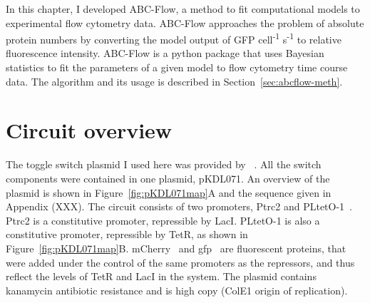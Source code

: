 In this chapter, I developed ABC-Flow, a method to fit computational models to experimental flow cytometry data. ABC-Flow approaches the problem of absolute protein numbers by converting the model output of GFP cell\textsuperscript{-1} s\textsuperscript{-1} to relative fluorescence intensity. ABC-Flow is a python package that uses Bayesian statistics to fit the parameters of a given model to flow cytometry time course data. The algorithm and its usage is described in Section~\ref{sec:abcflow-meth}.





\section{Circuit overview}

The toggle switch plasmid I used here was provided by ~\textcite{Litcofsky:2012gr}. All the switch components were contained in one plasmid, pKDL071. An overview of the plasmid is shown in Figure~\ref{fig:pKDL071map}A and the sequence given in Appendix (XXX). The circuit consists of two promoters, Ptrc2 and PLtetO-1~\autocite{Lutz:1997ti}. Ptrc2 is a constitutive promoter, repressible by LacI. PLtetO-1 is also a constitutive promoter, repressible by TetR, as shown in Figure~\ref{fig:pKDL071map}B. mCherry~\autocite{Shaner:2004vy} and \acrshort{gfp}~\autocite{SHIMOMURA:1962va} are fluorescent proteins, that were added under the control of the same promoters as the repressors, and thus reflect the levels of TetR and LacI in the system. The plasmid contains kanamycin antibiotic resistance and is high copy (ColE1 origin of replication).

